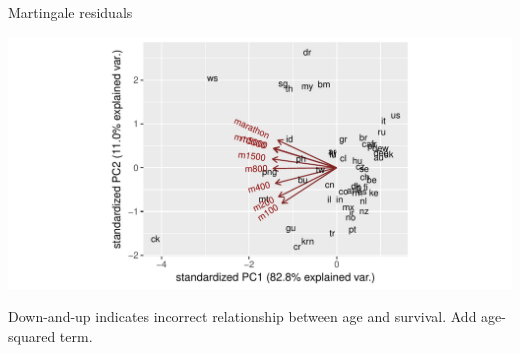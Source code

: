 \begin{frame}[fragile]{Martingale residuals}

\begin{knitrout}
\color{fgcolor}\begin{kframe}
\begin{alltt}
\hlopt{+}\hlstd{(}
\end{alltt}


{\ttfamily\noindent\itshape\color{messagecolor}{\#\# `geom\_smooth()` using method = 'loess'}}\end{kframe}
\includegraphics[width=\maxwidth]{figure/unnamed-chunk-26-1} 

\end{knitrout}

Down-and-up indicates incorrect relationship between age and
survival. Add age-squared term.
\end{frame}

